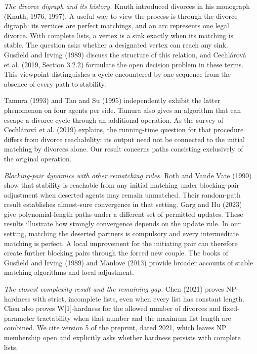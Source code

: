 \documentclass[11pt,letterpaper]{article}
\theoremstyle{definition}
\begin{document}
\noindent\textit{The divorce digraph and its history.}
Knuth introduced divorces in his monograph (Knuth, 1976, 1997). A useful way to view the process is through the divorce digraph: its vertices are perfect matchings, and an arc represents one legal divorce. With complete lists, a vertex is a sink exactly when its matching is stable. The question asks whether a designated vertex can reach any sink. Gusfield and Irving (1989) discuss the structure of this relation, and Cechlárová et al. (2019, Section 3.2.2) formulate the open decision problem in these terms. This viewpoint distinguishes a cycle encountered by one sequence from the absence of every path to stability.

Tamura (1993) and Tan and Su (1995) independently exhibit the latter phenomenon on four agents per side. Tamura also gives an algorithm that can escape a divorce cycle through an additional operation. As the survey of Cechlárová et al. (2019) explains, the running-time question for that procedure differs from divorce reachability: its output need not be connected to the initial matching by divorces alone. Our result concerns paths consisting exclusively of the original operation.

\medskip\noindent\textit{Blocking-pair dynamics with other rematching rules.}
Roth and Vande Vate (1990) show that stability is reachable from any initial matching under blocking-pair adjustment when deserted agents may remain unmatched. Their random-path result establishes almost-sure convergence in that setting. Garg and Hu (2023) give polynomial-length paths under a different set of permitted updates. These results illustrate how strongly convergence depends on the update rule. In our setting, matching the deserted partners is compulsory and every intermediate matching is perfect. A local improvement for the initiating pair can therefore create further blocking pairs through the forced new couple. The books of Gusfield and Irving (1989) and Manlove (2013) provide broader accounts of stable matching algorithms and local adjustment.

\medskip\noindent\textit{The closest complexity result and the remaining gap.}
Chen (2021) proves NP-hardness with strict, incomplete lists, even when every list has constant length. Chen also proves W[1]-hardness for the allowed number of divorces and fixed-parameter tractability when that number and the maximum list length are combined. We cite version 5 of the preprint, dated 2021, which leaves NP membership open and explicitly asks whether hardness persists with complete lists.
\end{document}
